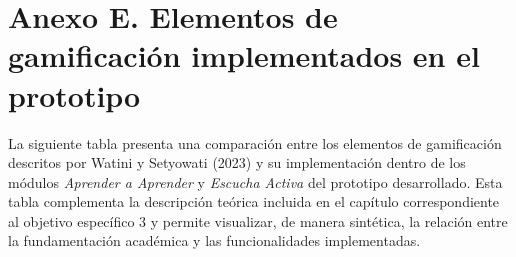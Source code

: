 \section*{Anexo E. Elementos de gamificación implementados en el prototipo}
\label{anexo:gamificacion}

La siguiente tabla presenta una comparación entre los elementos de gamificación descritos por Watini y Setyowati (2023) y su implementación dentro de los módulos \textit{Aprender a Aprender} y \textit{Escucha Activa} del prototipo desarrollado. Esta tabla complementa la descripción teórica incluida en el capítulo correspondiente al objetivo específico 3 y permite visualizar, de manera sintética, la relación entre la fundamentación académica y las funcionalidades implementadas.

\vspace{0.4cm}

